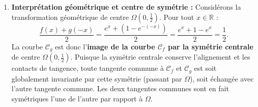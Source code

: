 \documentclass[11pt,a4paper]{article}
\newcommand{\R}{\mathbb{R}}
\begin{document}
\begin{correctionbox}[Exercice 6]
\begin{enumerate}[label=\textbf{\arabic*.}]
\begin{itemize}
\begin{itemize}
            Elle réalise une bijection de $[0, +\infty[$ sur $[-1, +\infty[$.
            Comme $0 \in ]-1, +\infty[$, il existe un \textbf{unique réel $a_2 \in ]0, +\infty[$} tel que $h(a_2) = 0$.
            Encadrement : $h(0) = -1 < 0$ et $h(1) = 2(0)e^1 + 1 = 1 > 0$.
            Donc $0 < a_2 < 1$ (numériquement, $a_2 \approx 0{,}768$).
        \end{itemize}
        \item \textbf{Conclusion :}
        L'équation admet exactement \textbf{deux solutions réelles distinctes} $a_1$ et $a_2$.
        À chacune de ces valeurs correspond une abscisse de contact $a$ sur $\mathcal{C}_f$ et une abscisse de contact $b = -a$ sur $\mathcal{C}_g$.
        Les courbes $\mathcal{C}_f$ et $\mathcal{C}_g$ admettent donc \textbf{exactement deux tangentes communes distinctes}.
    \end{itemize}

    \item \textbf{Interprétation géométrique et centre de symétrie :}
    Considérons la transformation géométrique de centre $\Omega\left(0, \frac{1}{2}\right)$.
    Pour tout $x \in \R$ :
    \[
    \frac{f(x) + g(-x)}{2} = \frac{e^x + (1 - e^{-(-x)})}{2} = \frac{e^x + 1 - e^x}{2} = \frac{1}{2}.
    \]
    La courbe $\mathcal{C}_g$ est donc l'\textbf{image de la courbe $\mathcal{C}_f$ par la symétrie centrale} de centre $\Omega\left(0, \frac{1}{2}\right)$.
    Puisque la symétrie centrale conserve l'alignement et les contacts de tangence, toute tangente commune à $\mathcal{C}_f$ et $\mathcal{C}_g$ est soit globalement invariante par cette symétrie (passant par $\Omega$), soit échangée avec l'autre tangente commune. Les deux tangentes communes sont en fait symétriques l'une de l'autre par rapport à $\Omega$.
\end{enumerate}
\end{correctionbox}
\end{document}

